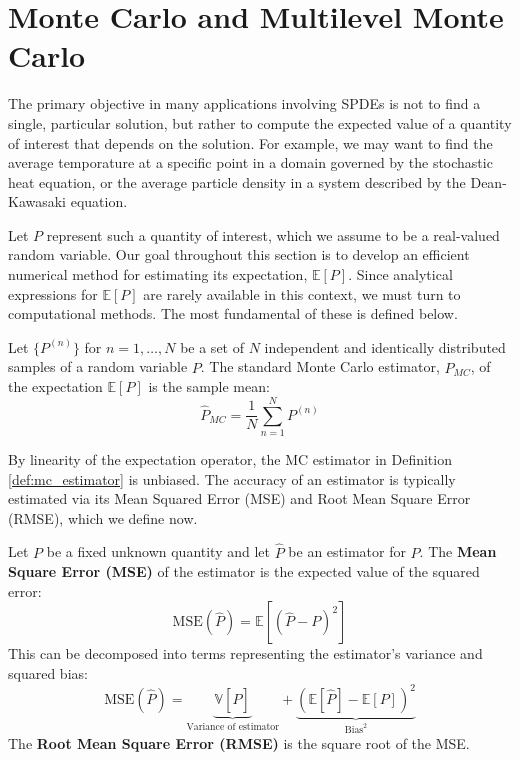 \section{Monte Carlo and Multilevel Monte Carlo}

The primary objective in many applications involving SPDEs is not to find 
a single, particular solution, but rather to compute the expected value of a quantity of 
interest that depends on the solution. For example, we may 
want to find the average temporature at a specific point in a domain 
governed by the stochastic heat equation, or the average particle density in a
system described by the Dean-Kawasaki equation.

Let $P$ represent such a quantity of interest, which we assume to be a real-valued 
random variable. Our goal throughout this section is to develop an efficient numerical
method for estimating its expectation, $\mathbb{E}[P]$. Since 
analytical expressions for $\mathbb{E}[P]$ are rarely available in this context, we must 
turn to computational methods. The most fundamental of these is defined below.

\begin{definition}\label{def:mc_estimator}
    Let $\{P^{(n)}\}$ for $n = 1, \dots, N$ be a set of $N$ independent and identically
    distributed samples of a random variable $P$. The standard Monte Carlo estimator,
    $\hat{P}_{MC}$, of the expectation $\mathbb{E}[P]$ is the sample mean:
    \[
    \hat{P}_{MC} = \frac{1}{N} \sum_{n=1}^N P^{(n)}
    \]
\end{definition}

By linearity of the expectation operator, the MC estimator in Definition \ref{def:mc_estimator} 
is unbiased. The accuracy of an estimator is typically estimated via its Mean Squared Error (MSE) and 
Root Mean Square Error (RMSE), which we define now.

\begin{definition}\label{def:mse_rmse}
    Let $P$ be a fixed unknown quantity and let $\hat{P}$ be an estimator for $P$. 
    The \textbf{Mean Square Error (MSE)} of the estimator is the expected value of 
    the squared error:
    \[
    \text{MSE}(\hat{P}) = \mathbb{E}[(\hat{P} - P)^2]
    \]
    This can be decomposed into terms representing the estimator's variance and squared bias:
    \[
    \text{MSE}(\hat{P}) = \underbrace{\mathbb{V}[\hat{P}]}_{\text{Variance of estimator}}
    + \underbrace{(\mathbb{E}[\hat{P}] - \mathbb{E}[P])^2}_{\text{Bias}^2}
    \]
    The \textbf{Root Mean Square Error (RMSE)} is the square root of the MSE.
\end{definition}


